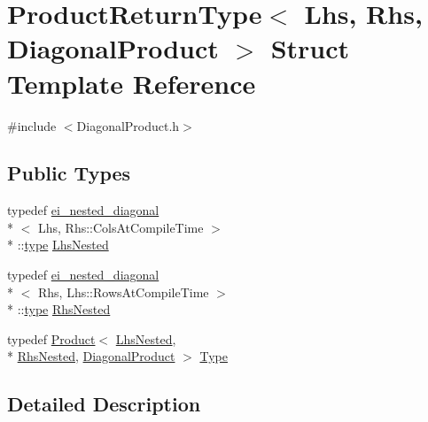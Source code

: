 \hypertarget{struct_product_return_type_3_01_lhs_00_01_rhs_00_01_diagonal_product_01_4}{\section{Product\-Return\-Type$<$ Lhs, Rhs, Diagonal\-Product $>$ Struct Template Reference}
\label{struct_product_return_type_3_01_lhs_00_01_rhs_00_01_diagonal_product_01_4}
}


{\ttfamily \#include $<$Diagonal\-Product.\-h$>$}

\subsection*{Public Types}
\begin{DoxyCompactItemize}
\item 
typedef \hyperlink{structei__nested__diagonal}{ei\-\_\-nested\-\_\-diagonal}\\*
$<$ Lhs, Rhs\-::\-Cols\-At\-Compile\-Time $>$\\*
\-::\hyperlink{glext_8h_a7d05960f4f1c1b11f3177dc963a45d86}{type} \hyperlink{struct_product_return_type_3_01_lhs_00_01_rhs_00_01_diagonal_product_01_4_adb466f67e94e07ae75e102629849e1cf}{Lhs\-Nested}
\item 
typedef \hyperlink{structei__nested__diagonal}{ei\-\_\-nested\-\_\-diagonal}\\*
$<$ Rhs, Lhs\-::\-Rows\-At\-Compile\-Time $>$\\*
\-::\hyperlink{glext_8h_a7d05960f4f1c1b11f3177dc963a45d86}{type} \hyperlink{struct_product_return_type_3_01_lhs_00_01_rhs_00_01_diagonal_product_01_4_ae10e5b01aa73df49634a9c709899958a}{Rhs\-Nested}
\item 
typedef \hyperlink{class_product}{Product}$<$ \hyperlink{struct_product_return_type_3_01_lhs_00_01_rhs_00_01_diagonal_product_01_4_adb466f67e94e07ae75e102629849e1cf}{Lhs\-Nested}, \\*
\hyperlink{struct_product_return_type_3_01_lhs_00_01_rhs_00_01_diagonal_product_01_4_ae10e5b01aa73df49634a9c709899958a}{Rhs\-Nested}, \hyperlink{_constants_8h_a19539c4a85742928cd91d83569d63c06ac19552e515d2ba9858f05bfb1d09005f}{Diagonal\-Product} $>$ \hyperlink{struct_product_return_type_3_01_lhs_00_01_rhs_00_01_diagonal_product_01_4_a23c0bc007978b098272c10609575f52e}{Type}
\end{DoxyCompactItemize}


\subsection{Detailed Description}
